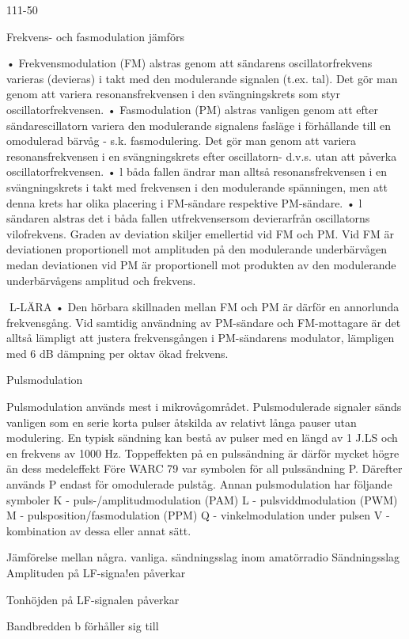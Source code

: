 \documentclass[a4paper,twoside,twocolumn,openright]{book}
\begin{document}
111-50

Frekvens- och fasmodulation jämförs

• Frekvensmodulation (FM) alstras genom
att sändarens oscillatorfrekvens varieras
(devieras) i takt med den modulerande
signalen (t.ex. tal). Det gör man genom att
variera resonansfrekvensen i den svängningskrets som styr oscillatorfrekvensen.
• Fasmodulation (PM) alstras vanligen genom att efter sändarescillatorn variera den
modulerande signalens fasläge i förhållande till en omodulerad bärvåg - s.k.
fasmodulering. Det gör man genom att
variera resonansfrekvensen i en svängningskrets efter oscillatorn- d.v.s. utan att
påverka oscillatorfrekvensen.
• l båda fallen ändrar man alltså resonansfrekvensen i en svängningskrets i takt med
frekvensen i den modulerande spänningen,
men att denna krets har olika placering i
FM-sändare respektive PM-sändare.
• l sändaren alstras det i båda fallen
utfrekvensersom devierarfrån oscillatorns
vilofrekvens. Graden av deviation skiljer
emellertid vid FM och PM. Vid FM är
deviationen proportionell mot amplituden
på den modulerande underbärvågen
medan deviationen vid PM är proportionell
mot produkten av den modulerande underbärvågens amplitud och frekvens.

L-LÄRA
• Den hörbara skillnaden mellan FM och PM
är därför en annorlunda frekvensgång.
Vid samtidig användning av PM-sändare
och FM-mottagare är det alltså lämpligt att
justera frekvensgången i PM-sändarens
modulator, lämpligen med 6 dB dämpning
per oktav ökad frekvens.

Pulsmodulation

Pulsmodulation används mest i mikrovågområdet. Pulsmodulerade signaler sänds
vanligen som en serie korta pulser åtskilda
av relativt långa pauser utan modulering.
En typisk sändning kan bestå av pulser
med en längd av 1 J.LS och en frekvens av
1000 Hz. Toppeffekten på en pulssändning
är därför mycket högre än dess medeleffekt
Före WARC 79 var symbolen för all pulssändning P. Därefter används P endast för
omodulerade pulståg. Annan pulsmodulation
har följande symboler
K - puls-/amplitudmodulation (PAM)
L - pulsviddmodulation (PWM)
M - pulsposition/fasmodulation (PPM)
Q - vinkelmodulation under pulsen
V - kombination av dessa eller annat sätt.

Jämförelse mellan några. vanliga. sändningsslag inom amatörradio
Sändningsslag Amplituden på
LF-signa!en
påverkar

Tonhöjden på
LF-signalen
påverkar

Bandbredden b
förhåller sig till
\end{document}
